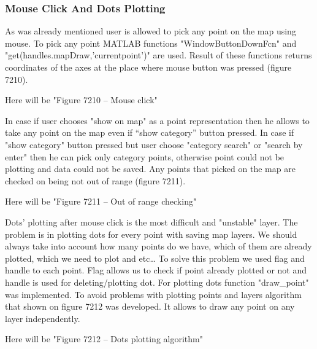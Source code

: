 		\subsubsection{Mouse Click And Dots Plotting}
		As was already mentioned user is allowed to pick any point on the map using mouse. To pick any point MATLAB functions "WindowButtonDownFcn" and "get(handles.mapDraw,'currentpoint')" are used. Result of these functions returns coordinates of the axes at the place where mouse button was pressed (figure 7210). 
		
		Here will be "Figure 7210 – Mouse click"
		
		In case if user chooses "show on map" as a point representation then he allows to take any point on the map even if “show category” button pressed. In case if "show category" button pressed but user choose "category search" or "search by enter" then he can pick only category points, otherwise point could not be plotting and data could not be saved. Any points that picked on the map are checked on being not out of range (figure 7211).
		
		Here will be "Figure 7211 – Out of range checking"
		
		Dots’ plotting after mouse click is the most difficult and "unstable" layer. The problem is in plotting dots for every point with saving map layers. We should always take into account how many points do we have, which of them are already plotted, which we need to plot and etc… 
		To solve this problem we used flag and handle to each point. Flag allows us to check if point already plotted or not and handle is used for deleting/plotting dot. For plotting dots function "draw\_point" was implemented. 
		To avoid problems with plotting points and layers algorithm that shown on figure 7212 was developed. It allows to draw any point on any layer independently.
		
		Here will be "Figure 7212 – Dots plotting algorithm"
